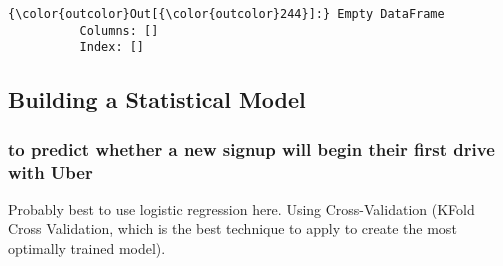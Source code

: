 \documentclass[11pt]{article}
\begin{document}
\begin{Verbatim}[commandchars=\\\{\}]
{\color{outcolor}Out[{\color{outcolor}244}]:} Empty DataFrame
          Columns: []
          Index: []
\end{Verbatim}
            
    \subsection{Building a Statistical
Model}\label{building-a-statistical-model}

\subsubsection{to predict whether a new signup will begin their first
drive with
Uber}\label{to-predict-whether-a-new-signup-will-begin-their-first-drive-with-uber}

    Probably best to use logistic regression here. Using Cross-Validation
(KFold Cross Validation, which is the best technique to apply to create
the most optimally trained model).
\end{document}
